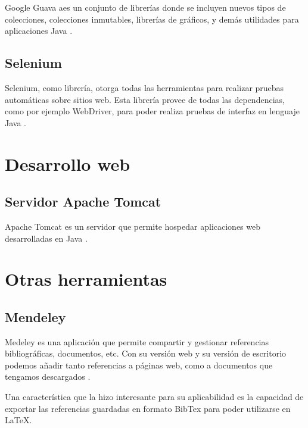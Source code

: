 Google Guava aes un conjunto de librerías donde se incluyen nuevos tipos de colecciones, colecciones inmutables, librerías de gráficos, y demás utilidades para aplicaciones Java \cite{guava:lib}.

\subsection{Selenium}

Selenium, como librería, otorga todas las herramientas para realizar pruebas automáticas sobre sitios web. Esta librería provee de todas las dependencias, como por ejemplo WebDriver, para poder realiza pruebas de interfaz en lenguaje Java \cite{sel:lib}.


\section{Desarrollo web}

\subsection{Servidor Apache Tomcat}

Apache Tomcat es un servidor que permite hospedar aplicaciones web desarrolladas en Java \cite{tomcat:wiki}.

\section{Otras herramientas}

\subsection{Mendeley}

Medeley es una aplicación que permite compartir y gestionar referencias bibliográficas, documentos, etc. Con su versión web y su versión de escritorio podemos añadir tanto referencias a páginas web, como a documentos que tengamos descargados \cite{mende:wiki}.

Una característica que la hizo interesante para su aplicabilidad es la capacidad de exportar las referencias guardadas en formato BibTex para poder utilizarse en LaTeX.
